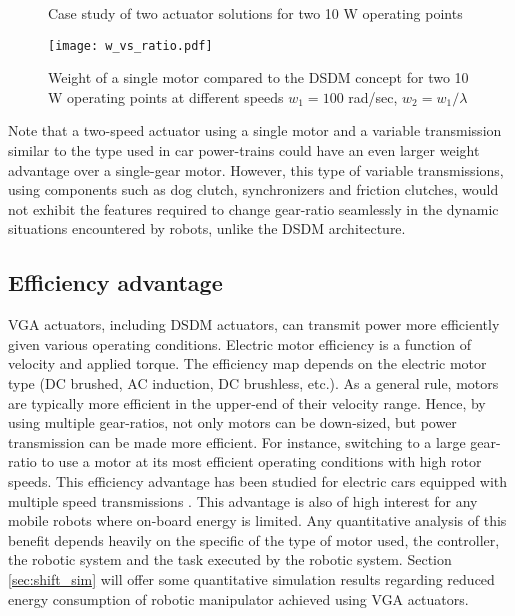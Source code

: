 \begin{figure}[H]
        \centering
        \caption{Case study of two actuator solutions for two 10 W operating points }\label{fig:solutions}
\end{figure}

\begin{figure}[H]
	\centering
		\texttt{[image: w\_vs\_ratio.pdf]}
	\caption[DSDM weight analysis]{Weight of a single motor compared to the DSDM concept for two 10 W operating points at different speeds $w_1=100$ rad/sec, $w_2 = w_1 / \lambda$}
	\label{fig:1vs2}
\end{figure}

Note that a two-speed actuator using a single motor and a variable transmission similar to the type used in car power-trains could have an even larger weight advantage over a single-gear motor. However, this type of variable transmissions, using components such as dog clutch, synchronizers and friction clutches, would not exhibit the features required to change gear-ratio seamlessly in the dynamic situations encountered by robots, unlike the DSDM architecture.

\subsection{Efficiency advantage}
\label{sec:EffAdvantage}

VGA actuators, including DSDM actuators, can transmit power more efficiently given various operating conditions. Electric motor efficiency is a function of velocity and applied torque. The efficiency map depends on the electric motor type (DC brushed, AC induction, DC brushless, etc.). As a general rule, motors are typically more efficient in the upper-end of their velocity range. Hence, by using multiple gear-ratios, not only motors can be down-sized, but power transmission can be made more efficient. For instance, switching to a large gear-ratio to use a motor at its most efficient operating conditions with high rotor speeds. This efficiency advantage has been studied for electric cars equipped with multiple speed transmissions \cite{ren_effect_2009} \cite{holdstock_energy_2012} \cite{zhang_three-speed_2013} \cite{mckeegan_antonovs_2011}. This advantage is also of high interest for any mobile robots where on-board energy is limited. Any quantitative analysis of this benefit depends heavily on the specific of the type of motor used, the controller, the robotic system and the task executed by the robotic system. Section \ref{sec:shift_sim} will offer some quantitative simulation results regarding reduced energy consumption of robotic manipulator achieved using VGA actuators.

